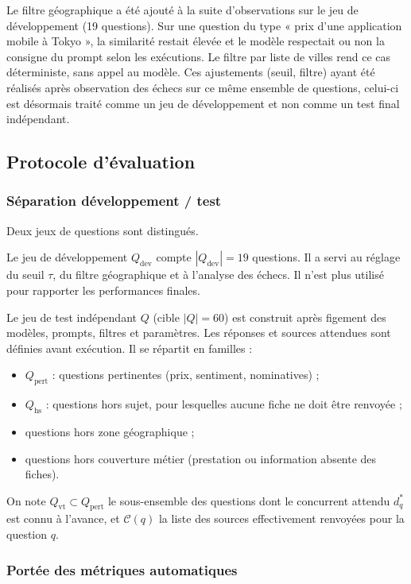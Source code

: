 Le filtre géographique a été ajouté à la suite d'observations sur le jeu de
développement (19 questions). Sur une question du type « prix d'une application
mobile à Tokyo », la similarité restait élevée et le modèle respectait ou non
la consigne du prompt selon les exécutions. Le filtre par liste de villes rend
ce cas déterministe, sans appel au modèle. Ces ajustements (seuil, filtre)
ayant été réalisés après observation des échecs sur ce même ensemble de
questions, celui-ci est désormais traité comme un jeu de développement et non
comme un test final indépendant.

\subsection{Protocole d'évaluation}

\subsubsection{Séparation développement / test}

Deux jeux de questions sont distingués.

Le jeu de développement $Q_{\text{dev}}$ compte $|Q_{\text{dev}}| = 19$ questions.
Il a servi au réglage du seuil $\tau$, du filtre géographique et à l'analyse des
échecs. Il n'est plus utilisé pour rapporter les performances finales.

Le jeu de test indépendant $Q$ (cible $|Q| = 60$) est construit après figement
des modèles, prompts, filtres et paramètres. Les réponses et sources attendues
sont définies avant exécution. Il se répartit en familles :
\begin{itemize}
    \item $Q_{\text{pert}}$ : questions pertinentes (prix, sentiment, nominatives) ;
    \item $Q_{\text{hs}}$ : questions hors sujet, pour lesquelles aucune fiche
    ne doit être renvoyée ;
    \item questions hors zone géographique ;
    \item questions hors couverture métier (prestation ou information absente
    des fiches).
\end{itemize}

On note $Q_{\text{vt}} \subset Q_{\text{pert}}$ le sous-ensemble des questions
dont le concurrent attendu $d^{*}_q$ est connu à l'avance, et $\mathcal{C}(q)$
la liste des sources effectivement renvoyées pour la question $q$.

\subsubsection{Portée des métriques automatiques}

